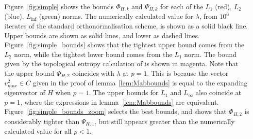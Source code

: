 \documentclass{iopart}
\begin{document}
Figure~\ref{fig:simple} shows the bounds $\Phi_{H,k}$ and 
$\Psi_{H,k}$ for each of the $L_1$ (red), $L_2$ (blue), $L_{\inf}$ (green) norms. The numerically calculated value for $\lambda$, from $10^6$ iterates of the standard orthonormalisation scheme, is shown as a solid black line. Upper bounds are shown as solid lines, and lower as dashed lines. 
Figure~\ref{fig:simple_bounds} shows that the tightest upper bound comes from the $L_2$ norm, while the tightest lower bound comes from the $L_1$ norm. The bound given by the topological entropy calculation of \cite{DAlessandro1999} is shown in magenta. Note that the upper bound $\Phi_{H,2}$ coincides with $\lambda$ at $p=1$. This is because the vector $v^2_{max} \in C$ given in the proof of lemma~\ref{lem:Mabbounds} is equal to the expanding eigenvector of $H$ when $p=1$. The upper bounds for $L_1$ and $L_{\infty}$ also coincide at $p=1$, where the expressions in lemma~\ref{lem:Mabbounds} are equivalent. Figure~\ref{fig:simple_bounds_zoom} selects the best bounds, and shows that $\Phi_{H,2}$ is considerably tighter than $\Psi_{H,1}$, but still appears greater than the numerically calculated value for all $p<1$. 
\end{document}
